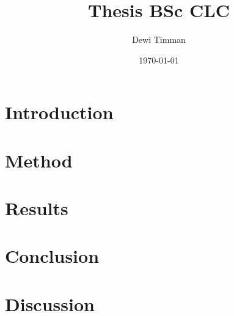 \documentclass{article}
\title{Thesis BSc CLC}
\author{Dewi Timman}
\date{\today}
\begin{document}
\maketitle


\section{Introduction}


\section{Method}

\section{Results}

\section{Conclusion}

\section{Discussion}
\end{document}
